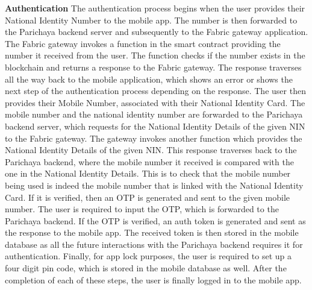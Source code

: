 \textbf{Authentication} \newline
The authentication process begins when the user provides their National Identity Number to the mobile app. The number is then forwarded to the Parichaya backend server and subsequently to the Fabric gateway application. The Fabric gateway invokes a function in the smart contract providing the number it received from the user. The function checks if the number exists in the blockchain and returns a response to the Fabric gateway. The response traverses all the way back to the mobile application, which shows an error or shows the next step of the authentication process depending on the response. The user then provides their Mobile Number, associated with their National Identity Card. The mobile number and the national identity number are forwarded to the Parichaya backend server, which requests for the National Identity Details of the given NIN to the Fabric gateway. The gateway invokes another function which provides the National Identity Details of the given NIN. This response traverses back to the Parichaya backend, where the mobile number it received is compared with the one in the National Identity Details. This is to check that the mobile number being used is indeed the mobile number that is linked with the National Identity Card. If it is verified, then an OTP is generated and sent to the given mobile number. The user is required to input the OTP, which is forwarded to the Parichaya backend. If the OTP is verified, an auth token is generated and sent as the response to the mobile app. The received token is then stored in the mobile database as all the future interactions with the Parichaya backend requires it for authentication. Finally, for app lock purposes, the user is required to set up a four digit pin code, which is stored in the mobile database as well. After the completion of each of these steps, the user is finally logged in to the mobile app.
    
